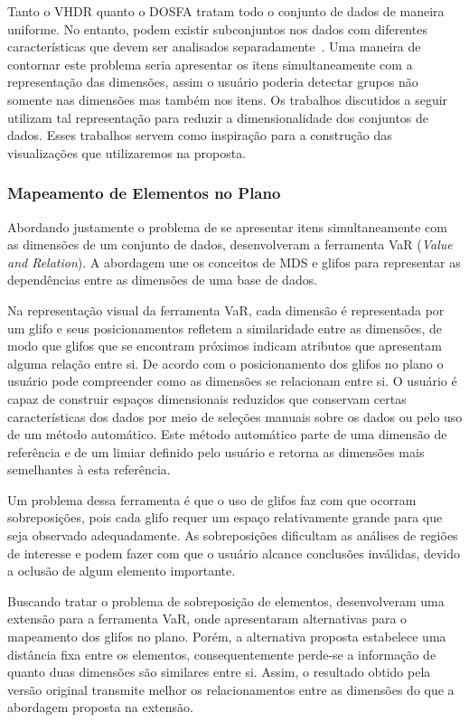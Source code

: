 Tanto o VHDR quanto o DOSFA tratam todo o conjunto de dados
de maneira uniforme. No entanto, podem existir subconjuntos
nos dados com diferentes características que devem ser
analisados separadamente~\cite{May2011}. Uma maneira de
contornar este problema seria apresentar os itens
simultaneamente com a representação das dimensões, assim o
usuário poderia detectar grupos não somente nas dimensões
mas também nos itens. Os trabalhos discutidos a seguir
utilizam tal representação para reduzir a dimensionalidade
dos conjuntos de dados. Esses trabalhos servem como
inspiração para a construção das visualizações que
utilizaremos na proposta.  

\subsubsection{Mapeamento de Elementos no Plano}

Abordando justamente o problema de se apresentar itens
simultaneamente com as dimensões de um conjunto de dados,
\citet{Yang2004} desenvolveram a ferramenta VaR (\emph{Value and
Relation}). A abordagem une os conceitos de MDS e glifos para
representar as dependências entre as dimensões de uma base
de dados. 

Na representação visual da ferramenta VaR, cada dimensão é
representada por um glifo e seus posicionamentos refletem a
similaridade entre as dimensões, de modo que glifos que se
encontram próximos indicam atributos que apresentam alguma
relação entre si. De acordo com o posicionamento dos glifos
no plano o usuário pode compreender como as dimensões se
relacionam entre si. O usuário é capaz de construir espaços
dimensionais reduzidos que conservam certas características
dos dados por meio de seleções manuais sobre os dados ou
pelo uso de um método automático. Este método automático
parte de uma dimensão de referência e de um limiar definido
pelo usuário e retorna as dimensões mais semelhantes à esta
referência.

Um problema dessa ferramenta é que o uso de glifos faz com
que ocorram sobreposições, pois cada glifo requer um espaço
relativamente grande para que seja observado adequadamente.
As sobreposições dificultam as análises de regiões de
interesse e podem fazer com que o usuário alcance conclusões
inválidas, devido a oclusão de algum elemento importante.  

Buscando tratar o problema de sobreposição de elementos,
\citet{Yang2007} desenvolveram uma extensão para a
ferramenta VaR, onde apresentaram alternativas para o
mapeamento dos glifos no plano. Porém, a alternativa
proposta estabelece uma distância fixa entre os elementos,
consequentemente perde-se a informação de quanto duas
dimensões são similares entre si. Assim, o resultado obtido
pela versão original transmite melhor os relacionamentos entre
as dimensões do que a abordagem proposta na extensão. 

